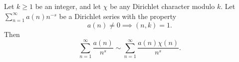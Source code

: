 Let $k \geq 1$ be an integer, and let $\chi$ be any Dirichlet character modulo $k$. Let $\sum_{n=1}^\infty a(n) n^{-s}$ be a Dirichlet series with the property
$$
a(n) \neq 0 \implies (n, k) = 1.
$$
Then
$$
\sum_{n=1}^\infty \frac{a(n)}{n^s} \sim \sum_{n=1}^\infty \frac{a(n)\chi(n)}{n^s}.
$$
